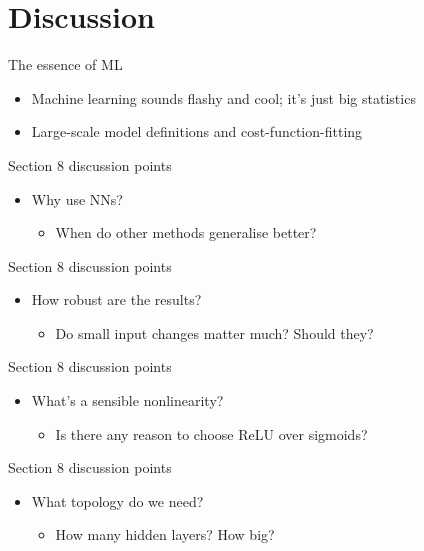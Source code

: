 \documentclass[presentation]{beamer}
\begin{document}
\section{Discussion}
\label{sec:orgce99ca9}
\begin{frame}[label={sec:orgb2d8594}]{The essence of ML}
\begin{itemize}
\item Machine learning sounds flashy and cool; it's just big statistics
\item Large-scale model definitions and cost-function-fitting
\end{itemize}
\end{frame}

\begin{frame}[label={sec:orge8f2e22}]{Section 8 discussion points}
\begin{itemize}
\item Why use NNs?
\begin{itemize}
\item When do other methods generalise better?
\end{itemize}
\end{itemize}
\end{frame}
\begin{frame}[label={sec:org01d51af}]{Section 8 discussion points}
\begin{itemize}
\item How robust are the results?
\begin{itemize}
\item Do small input changes matter much? Should they?
\end{itemize}
\end{itemize}
\end{frame}
\begin{frame}[label={sec:org3b66f80}]{Section 8 discussion points}
\begin{itemize}
\item What's a sensible nonlinearity?
\begin{itemize}
\item Is there any reason to choose ReLU over sigmoids?
\end{itemize}
\end{itemize}
\end{frame}
\begin{frame}[label={sec:orgf64a65a}]{Section 8 discussion points}
\begin{itemize}
\item What topology do we need?
\begin{itemize}
\item How many hidden layers? How big?
\end{itemize}
\end{itemize}
\end{frame}
\end{document}
